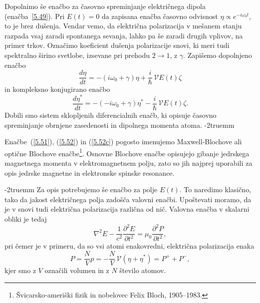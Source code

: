 Dopolnimo še enačbo za časovno spreminjanje električnega dipola 
(enačba~\ref{5.49}). Pri $E(t)=0$ da zapisana enačba časovno odvisnost 
$\eta \propto e^{-i \omega_0 t}$, to je brez dušenja. Vendar vemo, da električna
polarizacija v mešanem stanju razpada vsaj zaradi spontanega sevanja, lahko
pa še zaradi drugih vplivov, na primer trkov. Označimo
koeficient dušenja polarizacije snovi, ki meri tudi spektralno širino svetlobe, 
izsevane pri prehodu $2\rightarrow 1$, z $\gamma$. Zapišemo
dopolnjeno enačbo
\begin{equation}  
\label{5.52}
\frac{d\eta}{dt}=- \left(i \omega_0+\gamma\right)\eta+\frac{i}{\hslash}\,\mathcal{V} E(t) \zeta
\end{equation}
in kompleksno konjugirano enačbo
\begin{equation}  
\label{5.52c}
\frac{d\eta^*}{dt}=-\left(-i \omega_0+\gamma\right)\eta^*-\frac{i}{\hslash}\,\mathcal{V}E(t) \zeta.
\end{equation}
Dobili smo sistem sklopljenih diferencialnih enačb, ki opisuje časovno
spreminjanje obrnjene zasedenosti in dipolnega momenta atoma. 
\vglue-2truemm
\begin{remark}
 Enačbe~(\ref{5.51}), (\ref{5.52}) in (\ref{5.52c}) pogosto imenujemo 
 Maxwell-Blochove ali optične Blochove enačbe\footnote{Švicarsko-ameriški fizik 
 in nobelovec Felix Bloch, 1905--1983.}. Osnovne Blochove enačbe opisujejo gibanje 
 jedrskega magnetnega  momenta v elektromagnetnem polju, zato so jih najprej uporabili za opis 
 jedrske magnetne in elektronske spinske resonance. 
\end{remark}
\vglue-2truemm
Za opis potrebujemo še enačbo za polje $E(t)$. To naredimo klasično, tako da
jakost električnega polja zadošča valovni enačbi. Upoštevati moramo, 
da je v snovi tudi električna polarizacija različna od nič. 
Valovna enačba v skalarni obliki je tedaj
\begin{equation}  
\label{5.54}
\nabla^2 E-\frac{1}{c^2}\frac{\partial^2 E}{\partial t^2}=\mu_0 \frac{\partial^2 P}{\partial t^2},
\end{equation}
pri čemer je v primeru, da so vsi atomi enakovredni, električna polarizacija enaka
\begin{equation}  
\label{5.53}
P=\frac{N}{V}p = -\frac{N}{V}\,\mathcal{V}\left(\eta+\eta^{\ast}\right)=P^+ + P^-,
\end{equation}
kjer smo z $V$ označili volumen in z $N$ število atomov.

